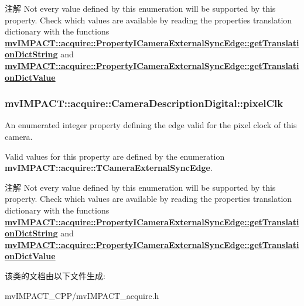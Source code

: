 \begin{DoxyNote}{注解}
Not every value defined by this enumeration will be supported by this property. Check which values are available by reading the properties translation dictionary with the functions {\bfseries \hyperlink{classmv_i_m_p_a_c_t_1_1acquire_1_1_enum_property_i_af5ec5a9c3657af2917f4ead78ef067db}{mv\+I\+M\+P\+A\+C\+T\+::acquire\+::\+Property\+I\+Camera\+External\+Sync\+Edge\+::get\+Translation\+Dict\+String}} and {\bfseries \hyperlink{classmv_i_m_p_a_c_t_1_1acquire_1_1_enum_property_i_a0c50700ebff2806621c63d03b624f200}{mv\+I\+M\+P\+A\+C\+T\+::acquire\+::\+Property\+I\+Camera\+External\+Sync\+Edge\+::get\+Translation\+Dict\+Value}} 
\end{DoxyNote}
\hypertarget{classmv_i_m_p_a_c_t_1_1acquire_1_1_camera_description_digital_a2b852526d2ca8cc3203e64af6903596e}{
\subsubsection[{pixel\+Clk}]{ mv\+I\+M\+P\+A\+C\+T\+::acquire\+::\+Camera\+Description\+Digital\+::pixel\+Clk}}\label{classmv_i_m_p_a_c_t_1_1acquire_1_1_camera_description_digital_a2b852526d2ca8cc3203e64af6903596e}


An enumerated integer property defining the edge valid for the pixel clock of this camera. 

Valid values for this property are defined by the enumeration {\bfseries mv\+I\+M\+P\+A\+C\+T\+::acquire\+::\+T\+Camera\+External\+Sync\+Edge}.

\begin{DoxyNote}{注解}
Not every value defined by this enumeration will be supported by this property. Check which values are available by reading the properties translation dictionary with the functions {\bfseries \hyperlink{classmv_i_m_p_a_c_t_1_1acquire_1_1_enum_property_i_af5ec5a9c3657af2917f4ead78ef067db}{mv\+I\+M\+P\+A\+C\+T\+::acquire\+::\+Property\+I\+Camera\+External\+Sync\+Edge\+::get\+Translation\+Dict\+String}} and {\bfseries \hyperlink{classmv_i_m_p_a_c_t_1_1acquire_1_1_enum_property_i_a0c50700ebff2806621c63d03b624f200}{mv\+I\+M\+P\+A\+C\+T\+::acquire\+::\+Property\+I\+Camera\+External\+Sync\+Edge\+::get\+Translation\+Dict\+Value}} 
\end{DoxyNote}


该类的文档由以下文件生成\+:\begin{DoxyCompactItemize}
\item 
mv\+I\+M\+P\+A\+C\+T\+\_\+\+C\+P\+P/mv\+I\+M\+P\+A\+C\+T\+\_\+acquire.\+h\end{DoxyCompactItemize}

